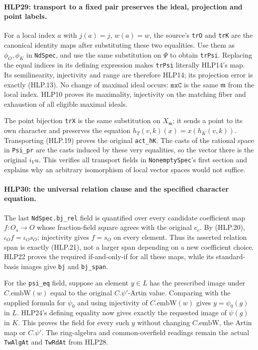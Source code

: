 \paragraph{HLP29: transport to a fixed pair preserves the ideal, projection and point labels.}
\label{claim:HLP29}
For a local index \(a\) with \(j(a)=j\), \(w(a)=w\), the source's
\texttt{trO} and \texttt{trK} are the canonical identity maps
after substituting these two equalities. Use them as
\(\phi_O,\phi_K\) in \texttt{NdSpec}, and use the same substitution
on \(\Psi\) to obtain \texttt{trPsi}. Replacing the equal indices
in its defining expression makes \texttt{trPsi} literally HLP14's
map. Its semilinearity, injectivity and range are therefore HLP14;
its projection error is exactly (HLP.13). No change of maximal
ideal occurs: \(\texttt{mxC}\) is the same \(\mathfrak m\) from
the local index. HLP10 proves its maximality, injectivity on the
matching fiber and exhaustion of all eligible maximal ideals.

The point bijection \texttt{trX} is the same substitution on
\(X_{\mathfrak m}\); it sends a point to its own character and
preserves the equation
\(h_T(v,k)(x)=x(h_K(v,k))\). Transporting (HLP.19) proves the
original \texttt{act\_hK}. The casts of the rational space in
\texttt{Psi\_pr} are the casts induced by these very equalities,
so the vector there is the original \(i_Vu\). This verifies all
transport fields in \texttt{NonemptySpec}'s first section and
explains why an arbitrary isomorphism of local vector spaces
would not suffice.

\paragraph{HLP30: the universal relation clause and the specified character equation.}
\label{claim:HLP30}
The last \texttt{NdSpec.bj\_rel} field is quantified over every
candidate coefficient map \(f:O_s\to O\) whose fraction-field
square agrees with the original \(e_c\). By (HLP.20),
\(\iota_Of=\iota_Os_O\); injectivity gives \(f=s_O\) on every
element. Thus its asserted relation span is exactly (HLP.21),
not a larger span depending on a new coefficient choice. HLP22
proves the required if-and-only-if for all these maps, while its
standard-basis images give \texttt{bj} and \texttt{bj\_span}.

For the \texttt{psi\_eq} field, suppose an element \(y\in L\)
has the prescribed image under \(C.\mathrm{embW}(w)\) equal to
the original \(C.\psi'\)-Artin value. Comparing with the supplied
formula for \(\psi_0\) and using injectivity of
\(C.\mathrm{embW}(w)\) gives \(y=\psi_0(g)\) in \(L\).
HLP24's defining equality now gives exactly the requested image
of \(\psi(g)\) in \(K\). This proves the field for every such
\(y\) without changing \(C.\mathrm{embW}\), the Artin map or
\(C.\psi'\). The ring-algebra and common-overfield readings remain
the actual \texttt{TwAlgAt} and \texttt{TwRdAt} from HLP28.

